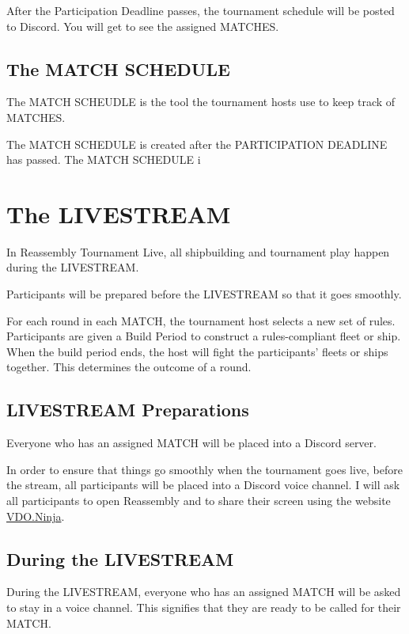 \documentclass[11pt]{article}
\newcommand{\RTL}{Reassembly Tournament Live}
\newcommand{\termemph}[1]{\uppercase{#1}}
\begin{document}
After the Participation Deadline passes, the tournament schedule will be posted to Discord.
You will get to see the assigned \termemph{matches}.

\subsection{The \termemph{Match Schedule}}
The \termemph{Match Scheudle} is the tool the tournament hosts use to keep track of
\termemph{Matches}.

The \termemph{Match Schedule} is created after the \termemph{Participation Deadline} has passed.
The \termemph{Match Schedule} i

\section{The \termemph{Livestream}}
In \RTL{}, all shipbuilding and tournament play happen during the \termemph{Livestream}.

Participants will be prepared before the \termemph{Livestream} so that it goes smoothly.

For each round in each \termemph{match}, the tournament host selects a new set of rules. Participants are
given a Build Period to construct a rules-compliant fleet or ship. When the build period ends,
the host will fight the participants' fleets or ships together. This determines the outcome of
a round.

\subsection{\termemph{Livestream} Preparations}
Everyone who has an assigned \termemph{match} will be placed into a Discord server. 

In order to ensure that things go smoothly when the tournament goes live, before the stream, 
all participants will be placed into a Discord voice channel. I will ask all participants to open 
Reassembly and to share their screen using the website \href{https://vdo.ninja/}{VDO.Ninja}.

\subsection{During the \termemph{Livestream}}
During the \termemph{Livestream}, everyone who has an assigned \termemph{match} will be asked to stay in a voice
channel. This signifies that they are ready to be called for their \termemph{match}. 
\end{document}

